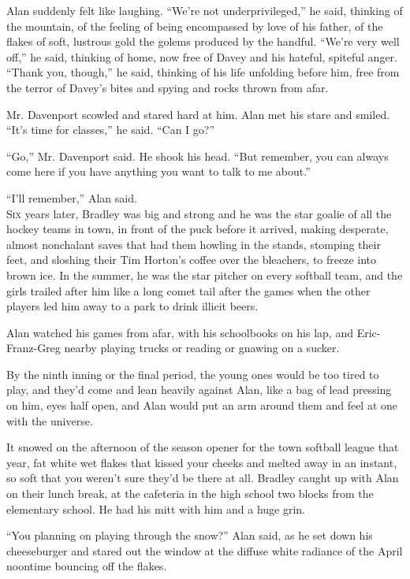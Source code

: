 \documentclass{article}
\begin{document}
Alan suddenly felt like laughing.  ``We're not underprivileged,'' he
said, thinking of the mountain, of the feeling of being encompassed by
love of his father, of the flakes of soft, lustrous gold the golems
produced by the handful.  ``We're very well off,'' he said, thinking
of home, now free of Davey and his hateful, spiteful anger.  ``Thank
you, though,'' he said, thinking of his life unfolding before him,
free from the terror of Davey's bites and spying and rocks thrown from
afar.

Mr.  Davenport scowled and stared hard at him.  Alan met his stare and
smiled.  ``It's time for classes,'' he said.  ``Can I go?''

``Go,'' Mr.  Davenport said.  He shook his head.  ``But remember, you
can always come here if you have anything you want to talk to me
about.''

``I'll remember,'' Alan said.
\\
\lettrine[lines=3, lhang=.5, nindent=0pt, findent=2pt]{S}{ix} years later, Bradley was big and strong and he was the star goalie
of all the hockey teams in town, in front of the puck before it
arrived, making desperate, almost nonchalant saves that had them
howling in the stands, stomping their feet, and sloshing their Tim
Horton's coffee over the bleachers, to freeze into brown ice.  In the
summer, he was the star pitcher on every softball team, and the girls
trailed after him like a long comet tail after the games when the
other players led him away to a park to drink illicit beers.

Alan watched his games from afar, with his schoolbooks on his lap, and
Eric-Franz-Greg nearby playing trucks or reading or gnawing on a
sucker.

By the ninth inning or the final period, the young ones would be too
tired to play, and they'd come and lean heavily against Alan, like a
bag of lead pressing on him, eyes half open, and Alan would put an arm
around them and feel at one with the universe.

It snowed on the afternoon of the season opener for the town softball
league that year, fat white wet flakes that kissed your cheeks and
melted away in an instant, so soft that you weren't sure they'd be
there at all.  Bradley caught up with Alan on their lunch break, at
the cafeteria in the high school two blocks from the elementary
school.  He had his mitt with him and a huge grin.

``You planning on playing through the snow?'' Alan said, as he set
down his cheeseburger and stared out the window at the diffuse white
radiance of the April noontime bouncing off the flakes.
\end{document}
